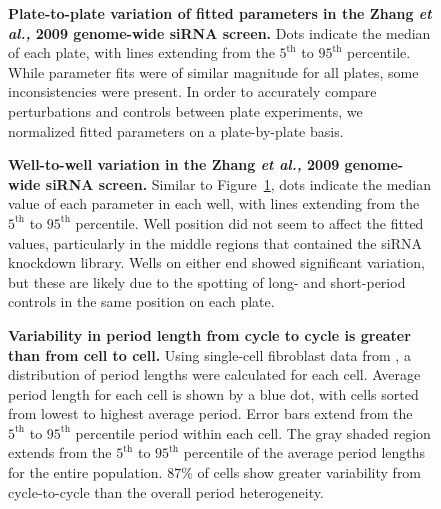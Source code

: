 \documentclass[11pt, letterpaper]{article}
\begin{document}
\begin{figure}[tbp]
  \begin{center}
  \end{center}
  \caption{{\bfseries Plate-to-plate variation of fitted parameters in the Zhang {\itshape et al.,} 2009 genome-wide siRNA screen.} Dots indicate the median of each plate, with lines extending from the $5^\text{th}$ to $95^\text{th}$ percentile. While parameter fits were of similar magnitude for all plates, some inconsistencies were present. In order to accurately compare perturbations and controls between plate experiments, we normalized fitted parameters on a plate-by-plate basis.}
\label{fig:plate_variation}
\end{figure}

\begin{figure}[tbp]
  \begin{center}
  \end{center}
  \caption{{\bfseries Well-to-well variation in the Zhang {\itshape et al.,} 2009 genome-wide siRNA screen.} Similar to Figure~\ref{fig:plate_variation}, dots indicate the median value of each parameter in each well, with lines extending from the $5^\text{th}$ to $95^\text{th}$ percentile. Well position did not seem to affect the fitted values, particularly in the middle regions that contained the siRNA knockdown library. Wells on either end showed significant variation, but these are likely due to the spotting of long- and short-period controls in the same position on each plate.}
\label{fig:well_variation}
\end{figure}

\begin{figure}[tbp]
  \begin{center}
  \end{center}
  \caption{{\bfseries Variability in period length from cycle to cycle is greater than from cell to cell.} Using single-cell fibroblast data from \cite{Leise2012}, a distribution of period lengths were calculated for each cell. Average period length for each cell is shown by a blue dot, with cells sorted from lowest to highest average period. Error bars extend from the $5^\text{th}$ to $95^\text{th}$ percentile period within each cell. The gray shaded region extends from the $5^\text{th}$ to $95^\text{th}$ percentile of the average period lengths for the entire population. $87\%$ of cells show greater variability from cycle-to-cycle than the overall period heterogeneity.}
  \label{fig:cell2cell-variability}
\end{figure}
\end{document}

